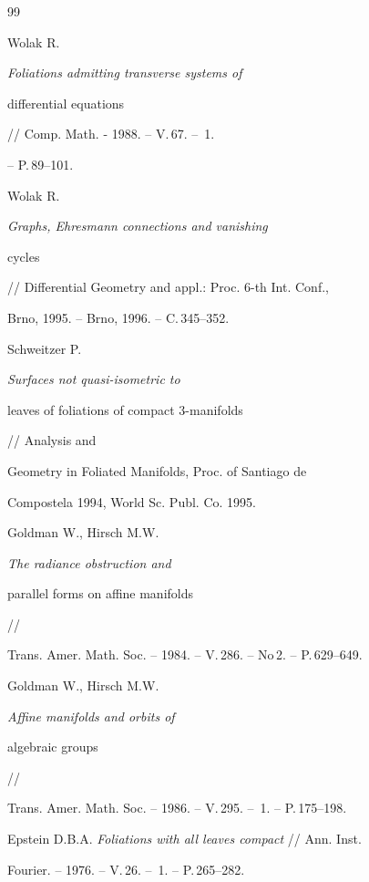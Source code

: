 \begin{thebibliography}{99}


Wolak R. {\em Foliations admitting transverse systems of


differential equations} // Comp. Math. - 1988. -- V.\,67. -- \No\,1.


-- P.\,89--101.







Wolak R. {\em Graphs, Ehresmann connections and vanishing


cycles} // Differential Geometry and appl.: Proc. 6-th Int. Conf.,


Brno, 1995. -- Brno, 1996. -- C.\,345--352.







Schweitzer P. {\em Surfaces not quasi-isometric to


leaves of foliations of compact $3$-manifolds} // Analysis and


Geometry in Foliated Manifolds, Proc. of Santiago de


Compostela 1994, World Sc. Publ. Co. 1995.







Goldman W., Hirsch M.W. {\em The radiance obstruction and


parallel forms on affine manifolds} //


Trans. Amer. Math. Soc. -- 1984. -- V.\,286. -- No\,2. -- P.\,629--649.







Goldman W.,  Hirsch M.W. {\em Affine manifolds and orbits of


algebraic groups} //


Trans. Amer. Math. Soc. -- 1986. -- V.\,295. -- \No\,1. -- P.\,175--198.







Epstein D.B.A. {\em Foliations with all leaves compact} // Ann. Inst.


Fourier. -- 1976. -- V.\,26. -- \No\,1. -- P.\,265--282.








\end{thebibliography}
